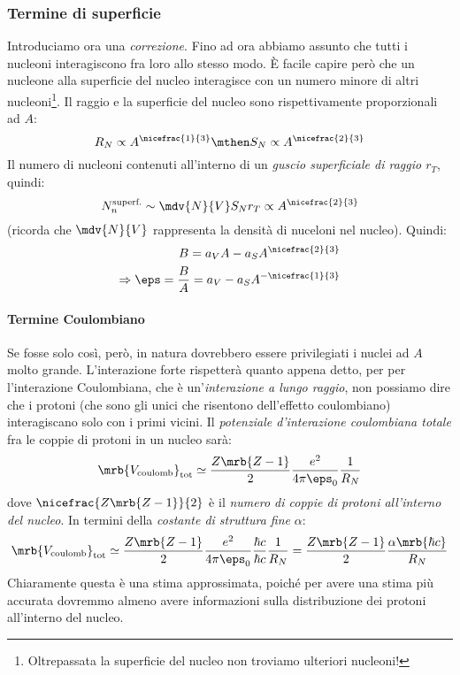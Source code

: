 \subsubsection{Termine di superficie}
Introduciamo ora una \textit{correzione}. Fino ad ora abbiamo assunto che tutti
i nucleoni interagiscono fra loro allo stesso modo. È facile capire però che un
nucleone alla superficie del nucleo interagisce con un numero minore di altri
nucleoni\footnote{
	Oltrepassata la superficie del nucleo non troviamo ulteriori nucleoni!
}.
Il raggio e la superficie del nucleo sono rispettivamente proporzionali ad $A$:
\begin{equation}
	R_N \propto A ^{\nicefrac{1}{3}}
	\mthen
	S_N \propto A ^{\nicefrac{2}{3}}
\end{equation}
Il numero di nucleoni contenuti all'interno di un \textit{guscio superficiale
	di raggio $r_T$}, quindi:
\begin{equation}
	N_n ^\text{superf.} \sim \mdv{N}{V} S_N r_T \propto A ^{\nicefrac{2}{3}}
\end{equation}
(ricorda che $\mdv{N}{V}$ rappresenta la densità di nuceloni nel nucleo).
Quindi:
\begin{align*}
	B = a_V A - a_S A ^{\nicefrac{2}{3}}
	\\
	\Rightarrow \eps = \frac{B}{A} = a_V - a_S A ^{-\nicefrac{1}{3}}
\end{align*}

\paragraph{Termine Coulombiano}
Se fosse solo così, però, in natura dovrebbero essere privilegiati i nuclei ad
$A$ molto grande. L'interazione forte rispetterà quanto appena detto, per per
l'interazione Coulombiana, che è un'\textit{interazione a lungo raggio}, non
possiamo dire che i protoni (che sono gli unici che risentono dell'effetto
coulombiano) interagiscano solo con i primi vicini. Il \textit{potenziale
	d'interazione coulombiana totale} fra le coppie di protoni in un nucleo sarà:
\begin{equation}
	\mrb{V _\text{coulomb}}_\text{tot} \simeq \frac{Z \mrb{Z - 1}}{2} \frac{e^2}{4
		\pi \eps_0} \frac{1}{R_N}
\end{equation}
dove $\nicefrac{Z \mrb{Z - 1}}{2}$ è il \textit{numero di coppie di protoni
	all'interno del nucleo}. In termini della \textit{costante di struttura fine}
$\alpha$:
\begin{equation}
	\mrb{V _\text{coulomb}}_\text{tot} \simeq \frac{Z \mrb{Z - 1}}{2}
	\frac{e^2}{4 \pi \eps_0} \frac{\hbar c}{\hbar c} \frac{1}{R_N} = \frac{Z
		\mrb{Z - 1}}{2} \frac{\alpha \mrb{\hbar c}}{R_N}
\end{equation}
Chiaramente questa è una stima approssimata, poiché per avere una stima più
accurata dovremmo almeno avere informazioni sulla distribuzione dei protoni
all'interno del nucleo.

